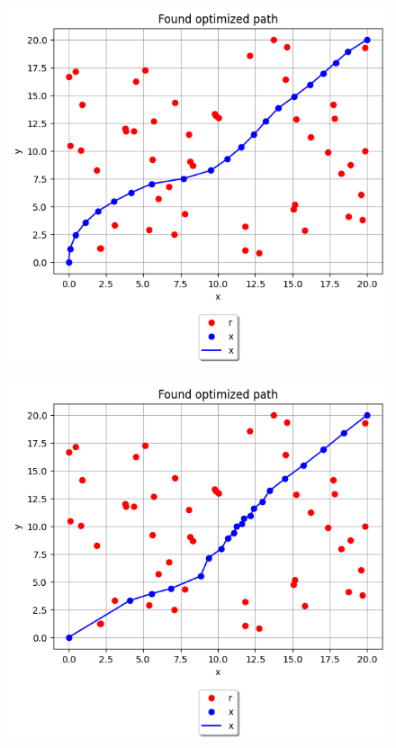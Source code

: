 \documentclass{article}
\begin{document}
\begin{figure}[H]
  \includegraphics[width=\linewidth]{figures/1.png}
\end{figure}

\begin{figure}[H]
  \includegraphics[width=\linewidth]{figures/2.png}
\end{figure}
\end{document}
